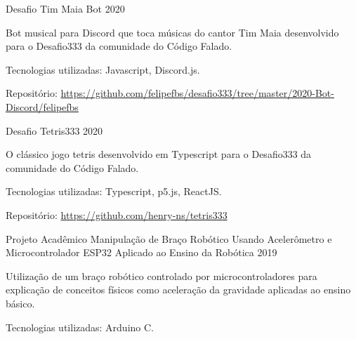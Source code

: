 \begin{cventries}
  \cventry
  {Desafio} %
  {Tim Maia Bot} %
  {} %
  {2020} %
  {
    \begin{cvitems} %
      \item {Bot musical para Discord que toca músicas do cantor Tim Maia desenvolvido para o Desafio333 da comunidade do Código Falado.}
      \item {Tecnologias utilizadas: Javascript, Discord.js.}
      \item {Repositório: \url{https://github.com/felipefbs/desafio333/tree/master/2020-Bot-Discord/felipefbs}}
    \end{cvitems}
  }

  \cventry
  {Desafio} %
  {Tetris333} %
  {} %
  {2020} %
  {
    \begin{cvitems} %
      \item {O clássico jogo tetris desenvolvido em Typescript para o Desafio333 da comunidade do Código Falado.}
      \item {Tecnologias utilizadas: Typescript,  p5.js, ReactJS.}
      \item {Repositório: \url{https://github.com/henry-ns/tetris333}}
    \end{cvitems}
  }

  \cventry
  {Projeto Acadêmico} %
  {Manipulação de Braço Robótico Usando Acelerômetro e Microcontrolador ESP32 Aplicado ao Ensino da Robótica} %
  {} %
  {2019} %
  {
    \begin{cvitems} %
      \item {Utilização de um braço robótico controlado por microcontroladores para explicação de conceitos físicos como aceleração da gravidade aplicadas ao ensino básico.}
      \item {Tecnologias utilizadas: Arduino C.}
    \end{cvitems}
  }


\end{cventries}